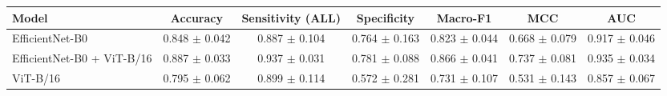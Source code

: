 \begin{tabular}{lcccccc}
\toprule
Model & Accuracy & Sensitivity (ALL) & Specificity & Macro-F1 & MCC & AUC \\
\midrule
EfficientNet-B0 & 0.848 $\pm$ 0.042 & 0.887 $\pm$ 0.104 & 0.764 $\pm$ 0.163 & 0.823 $\pm$ 0.044 & 0.668 $\pm$ 0.079 & 0.917 $\pm$ 0.046 \\
EfficientNet-B0 + ViT-B/16 & 0.887 $\pm$ 0.033 & 0.937 $\pm$ 0.031 & 0.781 $\pm$ 0.088 & 0.866 $\pm$ 0.041 & 0.737 $\pm$ 0.081 & 0.935 $\pm$ 0.034 \\
ViT-B/16 & 0.795 $\pm$ 0.062 & 0.899 $\pm$ 0.114 & 0.572 $\pm$ 0.281 & 0.731 $\pm$ 0.107 & 0.531 $\pm$ 0.143 & 0.857 $\pm$ 0.067 \\
\bottomrule
\end{tabular}